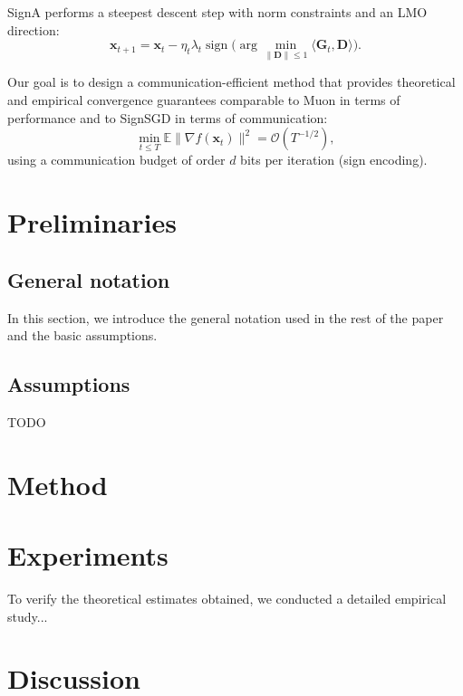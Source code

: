 \documentclass{article}
\begin{document}
SignA performs a steepest descent step with norm constraints and an LMO direction:
\begin{equation}
\mathbf{x}_{t+1} = \mathbf{x}_t - \eta_t \lambda_t \operatorname{sign}\Big(\arg\min_{\|\mathbf{D}\|\le 1}\langle \mathbf{G}_t, \mathbf{D}\rangle\Big).
\end{equation}

Our goal is to design a communication-efficient method that provides theoretical and empirical convergence guarantees comparable to Muon in terms of performance and to SignSGD in terms of communication:
\begin{equation}
\min_{t\le T}\mathbb{E}\|\nabla f(\mathbf{x}_t)\|^2 = \mathcal{O}(T^{-1/2}),
\end{equation}
using a communication budget of order $d$ bits per iteration (sign encoding).



\section{Preliminaries}\label{sec:prelim}

\subsection{General notation}

In this section, we introduce the general notation used in the rest of the paper and the basic assumptions. 

\subsection{Assumptions} 

TODO

\section{Method}\label{sec:method}

\section{Experiments}\label{sec:exp}

To verify the theoretical estimates obtained, we conducted a detailed empirical study...

\section{Discussion}\label{sec:disc}
\end{document}

